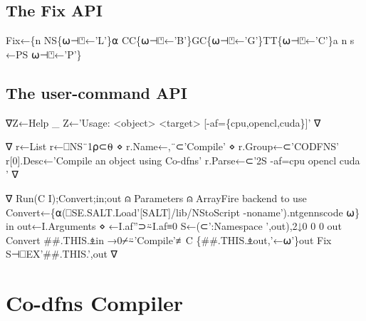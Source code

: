 \documentclass{article}%
\begin{document}
\subsection{The {\Tt{}Fix\nwendquote} API}

\nwenddocs{}\endmoddef\nwstartdeflinemarkup{}\nwenddeflinemarkup
Fix←\{n NS\{⍵⊣⍞←'L'\}⍺ CC\{⍵⊣⍞←'B'\}GC\{⍵⊣⍞←'G'\}TT\{⍵⊣⍞←'C'\}a n s ←PS ⍵⊣⍞←'P'\}
\nwendcode{}\nwdocspar

\subsection{The user-command API}

\nwenddocs{}\endmoddef\nwstartdeflinemarkup{}\nwenddeflinemarkup
∇Z←Help _
 Z←'Usage: <object> <target> [-af=\{cpu,opencl,cuda\}]'
∇

∇ r←List
 r←⎕NS¨1⍴⊂⍬ ⋄ r.Name←,¨⊂'Compile' ⋄ r.Group←⊂'CODFNS'
 r[0].Desc←'Compile an object using Co-dfns'
 r.Parse←⊂'2S -af=cpu opencl cuda '
∇

∇ Run(C I);Convert;in;out
⍝ Parameters
⍝    ArrayFire backend to use
 Convert←\{⍺(⎕SE.SALT.Load'[SALT]/lib/NStoScript -noname').ntgennscode ⍵\}
 in out←I.Arguments ⋄ ←I.af''⊃⍨I.af≡0
 S←(⊂':Namespace ',out),2↓0 0 0 out Convert ##.THIS.⍎in
 →0⌿⍨'Compile'≢C
 \{##.THIS.⍎out,'←⍵'\}out Fix S⊣⎕EX'##.THIS.',out
∇
\nwendcode{}\nwdocspar

\section{Co-dfns Compiler}
\end{document}
